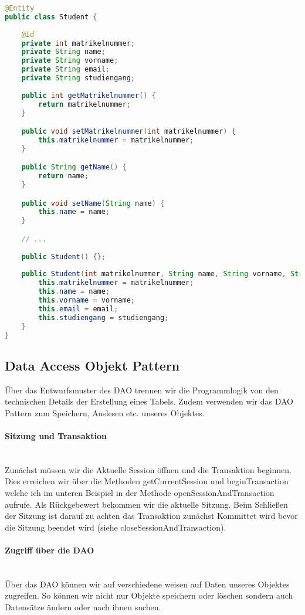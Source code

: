 \hspace{0pt}
\begin{lstlisting}[language=Java]
@Entity
public class Student {
	
	@Id
	private int matrikelnummer;
	private String name;
	private String vorname;
	private String email;
	private String studiengang;
	
	public int getMatrikelnummer() {
		return matrikelnummer;
	}

	public void setMatrikelnummer(int matrikelnummer) {
		this.matrikelnummer = matrikelnummer;
	}

	public String getName() {
		return name;
	}

	public void setName(String name) {
		this.name = name;
	}

	// ...
	
	public Student() {};
	
	public Student(int matrikelnummer, String name, String vorname, String email, String studiengang) {
		this.matrikelnummer = matrikelnummer;
		this.name = name;
		this.vorname = vorname;
		this.email = email;
		this.studiengang = studiengang;
	}
}

\end{lstlisting}

\subsection{Data Access Objekt Pattern}

Über das Entwurfsmuster des DAO trennen wir die Programmlogik  von den technischen Details der Erstellung eines Tabels. Zudem verwenden wir das DAO Pattern zum Speichern, Auslesen etc. unseres Objektes.

\paragraph{Sitzung und Transaktion} \hspace{0pt} \\
Zunächst müssen wir die Aktuelle Session öffnen und die Transaktion beginnen. Dies erreichen wir über die Methoden getCurrentSession und beginTransaction welche ich im unteren Beispiel in der Methode openSessionAndTransaction aufrufe. Als Rückgebewert bekommen wir die aktuelle Sitzung. Beim Schließen der Sitzung ist darauf zu achten das Transaktion zunächst Kommittet wird bevor die Sitzung beendet wird (siehe closeSessionAndTransaction).

\paragraph{Zugriff über die DAO} \hspace{0pt} \\
Über das DAO können wir auf verschiedene weisen auf Daten unseres Objektes zugreifen. So können wir nicht nur Objekte speichern oder löschen sondern auch Datensätze ändern oder nach ihnen suchen.

